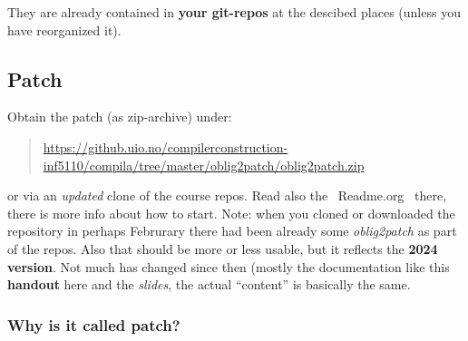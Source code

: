 \documentclass[11pt,freeform]{handout}[2014/08/13]
\begin{document}
They are already contained in \textbf{your git-repos} at the descibed
places (unless you have reorganized it).

\subsection*{Patch}
\label{sec:patch}


Obtain the patch (as zip-archive) under:

\begin{quote}
  \url{https://github.uio.no/compilerconstruction-inf5110/compila/tree/master/oblig2patch/oblig2patch.zip}
\end{quote}

or via an \emph{updated} clone of the course repos. Read also the
~Readme.org~ there, there is more info about how to start. Note: when you
cloned or downloaded the repository in perhaps Februrary there had been
already some \emph{oblig2patch} as part of the repos. Also that should be
more or less usable, but it reflects the \textbf{2024 version}. Not much
has changed since then (mostly the documentation like this \textbf{handout}
here and the \emph{slides}, the actual ``content'' is basically the same.

\iffalse
Here is an overview over the structure of the new stuff:


\begin{verbatim}
  oblig2patch/
  oblig2patch/src/
  oblig2patch/src/test-asinspiration/
  oblig2patch/src/test-asinspiration/Tester.java
  oblig2patch/src/test-asinspiration/FileEndingFilter.java
  oblig2patch/src/compiler/
  oblig2patch/src/compiler/Compiler.java
  oblig2patch/doc/
  oblig2patch/doc/obligs/
  oblig2patch/doc/obligs/handout-oblig2.pdf
  oblig2patch/doc/obligs/slides-oblig2.pdf
  oblig2patch/Readme.org
\end{verbatim}
\fi


\subsubsection*{Why is it called patch?}
\label{sec:why-it-called}
\end{document}
